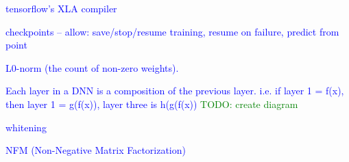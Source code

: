 

\textcolor{blue}{tensorflow's XLA compiler}

\textcolor{blue}{checkpoints -- allow: save/stop/resume training, resume on failure, predict from point}







\textcolor{blue}{L0-norm (the count of non-zero weights).}




\textcolor{blue}{Each layer in a DNN is a composition of the previous layer. i.e. if layer 1 = f(x), then layer 1 = g(f(x)), layer three is h(g(f(x)) \textcolor{green}{TODO: create diagram}}






\textcolor{blue}{whitening}

\textcolor{blue}{NFM (Non-Negative Matrix Factorization)}

